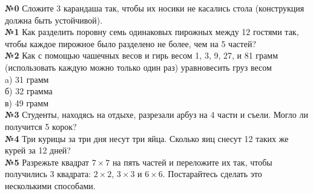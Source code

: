 \documentclass[12 pt, a5paper]{article}%
\newcommand{\task}[1]{{{\vspace{0.6cm} \vspace{-2ex} \textbf{№{#1}}  }}}
\begin{document}

	\centering
	\raggedright
	\task{0} Сложите 3 карандаша так, чтобы их носики не касались стола (конструкция должна быть устойчивой).
	\\
	\task{1} Как разделить поровну семь одинаковых пирожных между 12 гостями так, чтобы каждое пирожное было
	разделено не более, чем на 5 частей?
	\\
	\task{2} Как с помощью чашечных весов и гирь весом 1, 3, 9, 27, и 81 грамм (использовать каждую можно только один
	раз) уравновесить груз весом
	\\ \hspace{1em} a) 31 грамм
	\\  \hspace{1em} б) 32 грамма
	\\  \hspace{1em} в) 49 грамм
	\\
	\task{3}
	Студенты, находясь на отдыхе, разрезали арбуз на 4 части и съели. Могло ли получится 5 корок?
	\\
	\task{4} Три курицы за три дня несут три яйца. Сколько яиц снесут 12 таких же курей за 12 дней?
	\\
	\task{5} Разрежьте квадрат $7 \times 7$ на пять частей и переложите их так, чтобы получились 3 квадрата: $2 \times 2$,  $3 \times 3$ и $6 \times 6$. Постарайтесь сделать это несколькими способами.
\end{document}
